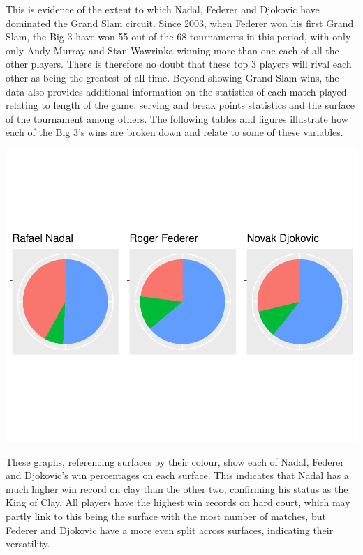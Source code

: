 \documentclass[11pt,preprint, authoryear]{elsarticle}
\numberwithin{equation}{section}
\numberwithin{figure}{section}
\numberwithin{table}{section}
\begin{document}
This is evidence of the extent to which Nadal, Federer and Djokovic have
dominated the Grand Slam circuit. Since 2003, when Federer won his first
Grand Slam, the Big 3 have won 55 out of the 68 tournaments in this
period, with only only Andy Murray and Stan Wawrinka winning more than
one each of all the other players. There is therefore no doubt that
these top 3 players will rival each other as being the greatest of all
time. Beyond showing Grand Slam wins, the data also provides additional
information on the statistics of each match played relating to length of
the game, serving and break points statistics and the surface of the
tournament among others. The following tables and figures illustrate how
each of the Big 3's wins are broken down and relate to some of these
variables.

\includegraphics{Write-up_files/figure-latex/more descriptive-1.pdf}

These graphs, referencing surfaces by their colour, show each of Nadal,
Federer and Djokovic's win percentages on each surface. This indicates
that Nadal has a much higher win record on clay than the other two,
confirming his status as the King of Clay. All players have the highest
win records on hard court, which may partly link to this being the
surface with the most number of matches, but Federer and Djokovic have a
more even split across surfaces, indicating their versatility.
\end{document}
